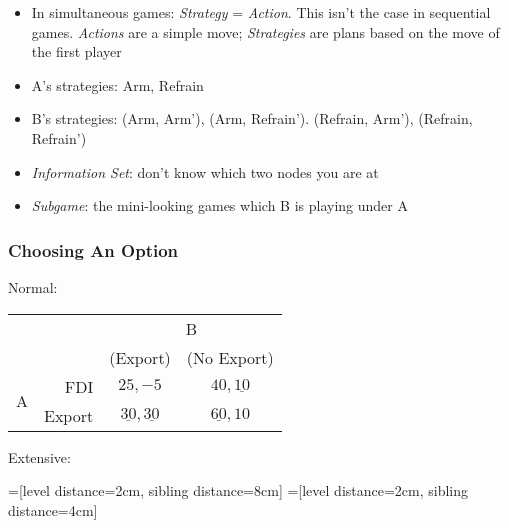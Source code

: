 \documentclass[11pt, english]{article}
\begin{document}
	\begin{itemize}
	\setlength\itemsep{0cm}
		\item In simultaneous games: \textit{Strategy} = \textit{Action}. This isn't the case in sequential games. \textit{Actions} are a simple move; \textit{Strategies} are plans based on the move of the first player
		\item A's strategies: Arm, Refrain
		\item B's strategies: (Arm, Arm'), (Arm, Refrain'). (Refrain, Arm'), (Refrain, Refrain')
		\item \textit{Information Set}: don't know which two nodes you are at
		\item \textit{Subgame}: the mini-looking games which B is playing under A
	\end{itemize}

		\subsubsection{Choosing An Option}

	Normal:

	\begin{table}[h]
                \renewcommand{\arraystretch}{1,25}
        \begin{center}
        \begin{tabular}{crcc}     
                & & \multicolumn{2}{c}{B}\\
                & & (Export) & (No Export)\\
                \cline{3-4}
		\multirow{2}{*}{A} & FDI & \multicolumn{1}{|c|}{$25,-5$} & \multicolumn{1}{c|}{$40,\underline{10}$}\\
                \cline{3-4}
		& Export & \multicolumn{1}{|c|}{$\underline{30},\underline{30}$} & \multicolumn{1}{c|}{$\underline{60},10$}\\
                \cline{3-4}
        \end{tabular}
        \end{center}
        \end{table}

	Extensive:

	=[level distance=2cm, sibling distance=8cm]
        =[level distance=2cm, sibling distance=4cm]
\end{document}
